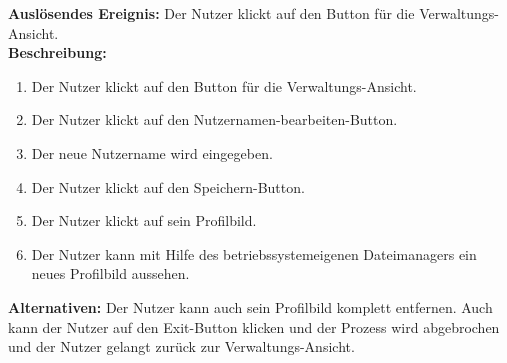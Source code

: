 \documentclass[parskip=full]{scrartcl}
\begin{document}
\textbf{Auslösendes Ereignis:} Der Nutzer klickt auf den Button für die Verwaltungs-Ansicht.\\
\textbf{Beschreibung:}
\begin{enumerate}
    \item Der Nutzer klickt auf den Button für die Verwaltungs-Ansicht.
    \item Der Nutzer klickt auf den Nutzernamen-bearbeiten-Button.
    \item Der neue Nutzername wird eingegeben.
    \item Der Nutzer klickt auf den Speichern-Button.
    \item Der Nutzer klickt auf sein Profilbild.
    \item Der Nutzer kann mit Hilfe des betriebssystemeigenen Dateimanagers ein neues Profilbild aussehen.
\end{enumerate}
\textbf{Alternativen:} Der Nutzer kann auch sein Profilbild komplett entfernen. Auch kann der Nutzer auf den Exit-Button klicken und der Prozess wird abgebrochen und der Nutzer gelangt zurück zur Verwaltungs-Ansicht.\\
\newpage
\end{document}
